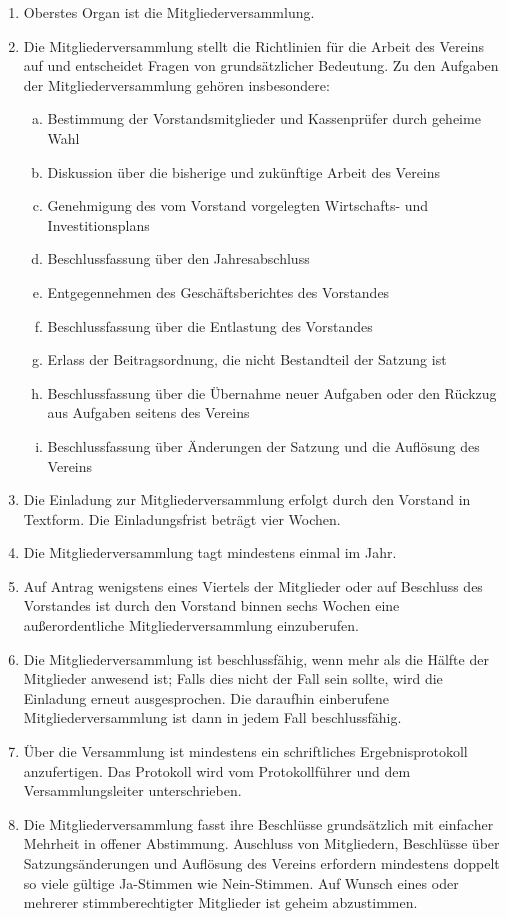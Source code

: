 \documentclass[12pt]{satzung}
\begin{document}
\begin{enumerate}[(1)]
    \item Oberstes Organ ist die Mitgliederversammlung.
    \item Die Mitgliederversammlung stellt die Richtlinien für die Arbeit des Vereins auf und entscheidet Fragen von grundsätzlicher Bedeutung. Zu den Aufgaben der Mitgliederversammlung gehören insbesondere:
      \begin{enumerate}[a)]
      \item Bestimmung der Vorstandsmitglieder und Kassenprüfer durch geheime Wahl
      \item Diskussion über die bisherige und zukünftige Arbeit des Vereins
      \item Genehmigung des vom Vorstand vorgelegten Wirtschafts- und Investitionsplans
      \item Beschlussfassung über den Jahresabschluss
      \item Entgegennehmen des Geschäftsberichtes des Vorstandes
      \item Beschlussfassung über die Entlastung des Vorstandes
      \item Erlass der Beitragsordnung, die nicht Bestandteil der Satzung ist
      \item Beschlussfassung über die Übernahme neuer Aufgaben oder den Rückzug aus Aufgaben seitens des Vereins
      \item Beschlussfassung über Änderungen der Satzung und die Auflösung des Vereins 
      \end{enumerate}
    \item Die Einladung zur Mitgliederversammlung erfolgt durch den Vorstand in Textform. Die Einladungsfrist beträgt vier Wochen.
    \item Die Mitgliederversammlung tagt mindestens einmal im Jahr.
    \item Auf Antrag wenigstens eines Viertels der Mitglieder oder auf Beschluss des Vorstandes ist durch den Vorstand binnen sechs Wochen eine außerordentliche Mitgliederversammlung einzuberufen.
    \item Die Mitgliederversammlung ist beschlussfähig, wenn mehr als die Hälfte der Mitglieder anwesend ist; Falls dies nicht der Fall sein sollte, wird die Einladung erneut ausgesprochen. Die daraufhin einberufene Mitgliederversammlung ist dann in jedem Fall beschlussfähig.
    \item Über die Versammlung ist mindestens ein schriftliches Ergebnisprotokoll anzufertigen. Das Protokoll wird vom Protokollführer und dem Versammlungsleiter unterschrieben.
    \item Die Mitgliederversammlung fasst ihre Beschlüsse grundsätzlich mit einfacher Mehrheit in offener Abstimmung. Auschluss von Mitgliedern, Beschlüsse über Satzungsänderungen und Auflösung des Vereins erfordern mindestens doppelt so viele gültige Ja-Stimmen wie Nein-Stimmen. Auf Wunsch eines oder mehrerer stimmberechtigter Mitglieder ist geheim abzustimmen. 
\end{enumerate}
\end{document}
